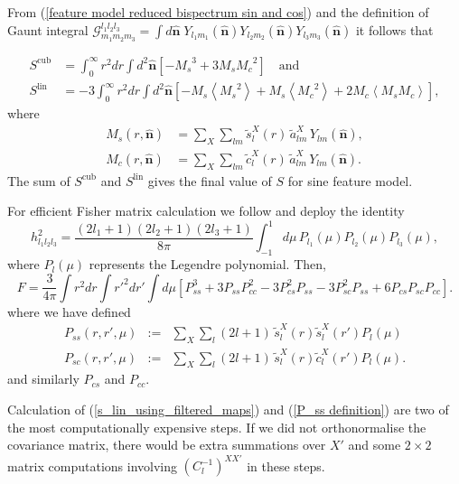 From (\ref{feature model reduced bispectrum sin and cos}) and the definition of Gaunt integral $\mathcal{G}^{l_1 l_2 l_3}_{m_1 m_2 m_3} = \int d\hat{\mathbf{n}} \; Y_{l_1 m_1}(\hat{\mathbf{n}}) Y_{l_2 m_2}(\hat{\mathbf{n}}) Y_{l_3 m_3}(\hat{\mathbf{n}})$ it follows that

\begin{align}
	S^\text{cub} &= \int_0^\infty r^2 dr \int d^2\hat{\mathbf{n}} \left[ - {M_s}^3 + 3 M_s {M_c}^2 \right] \quad\text{and} \\
	S^\text{lin} &= -3 \int_0^\infty r^2 dr \int d^2\hat{\mathbf{n}} \left[ - {M_s} \left<{M_s}^2\right> + M_s \left< {M_c}^2 \right> + 2 {M_c} \left< {M_s} {M_c} \right> \right], \label{s_lin_using_filtered_maps}
\end{align}
where
\begin{align}
	M_s(r, \hat{\mathbf{n}}) &= \sum_X \sum_{l m} \tilde{s}_l^X(r) \, \tilde{a}_{lm}^X \, Y_{lm}(\hat{\mathbf{n}}), \\
	M_c(r, \hat{\mathbf{n}}) &= \sum_X \sum_{l m} \tilde{c}_l^X(r) \, \tilde{a}_{lm}^X \, Y_{lm}(\hat{\mathbf{n}}).
	\label{M_s definition}
\end{align}
The sum of $S^\text{cub}$ and $S^\text{lin}$ gives the final value of $S$ for sine feature model.

For efficient Fisher matrix calculation we follow \cite{Smith2011} and deploy the identity
\begin{equation}
	h_{l_1 l_2 l_3} ^2 = \frac{(2l_1 +1)(2l_2 +1)(2l_3 +1)}{8\pi} \int_{-1}^{1} d\mu \, P_{l_1}(\mu)P_{l_2}(\mu)P_{l_3}(\mu), \label{h}
\end{equation}
where $P_{l}(\mu)$ represents the Legendre polynomial. Then,
\begin{equation}
	F = \frac{3}{4\pi} \int r^2 dr \int r'^2 dr' \int d\mu \left[ P_{ss}^3 + 3 P_{ss} P_{cc}^2 - 3 P_{cs}^2 P_{ss} - 3 P_{sc}^2 P_{ss} + 6 P_{cs}P_{sc}P_{cc} \right].
\end{equation}
where we have defined
\begin{eqnarray}
	P_{ss}(r, r', \mu) &:=& \sum_{X} \sum_{l} (2l+1) \, \tilde{s}_l^X(r) \tilde{s}_l^X(r') P_l(\mu) \nonumber \\
	P_{sc}(r, r', \mu) &:=& \sum_{X} \sum_{l} (2l+1) \, \tilde{s}_l^X(r) \tilde{c}_l^X(r') P_l(\mu).
	\label{P_ss definition}
\end{eqnarray}
and similarly $P_{cs}$ and $P_{cc}$.

Calculation of (\ref{s_lin_using_filtered_maps}) and (\ref{P_ss definition}) are two of the most computationally expensive steps. If we did not orthonormalise the covariance matrix, there would be extra summations over $X'$ and some $2\times2$ matrix computations involving $(C_l^{-1})^{XX'}$ in these steps.


